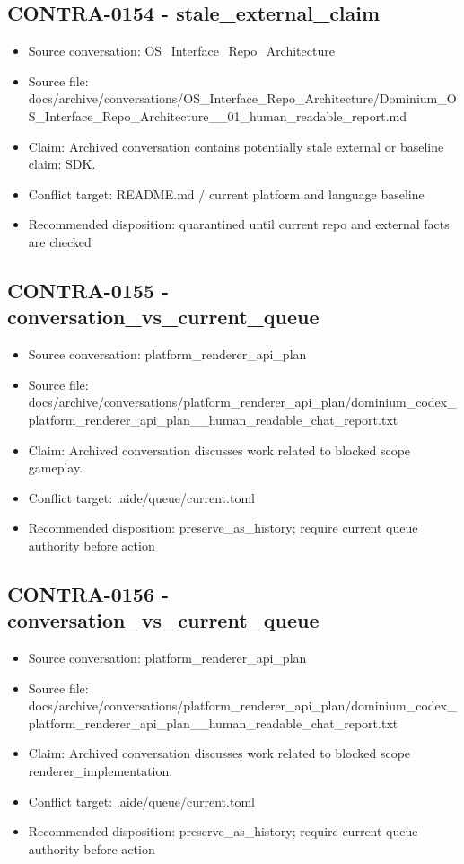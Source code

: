 \documentclass[11pt,a4paper]{report}
\begin{document}
\subsection{CONTRA-0154 - stale\_external\_claim}

\begin{itemize}
\item Source conversation: OS\_Interface\_Repo\_Architecture
\item Source file: docs/archive/conversations/OS\_Interface\_Repo\_Architecture/Dominium\_OS\_Interface\_Repo\_Architecture\_\_01\_human\_readable\_report.md
\item Claim: Archived conversation contains potentially stale external or baseline claim: SDK.
\item Conflict target: README.md / current platform and language baseline
\item Recommended disposition: quarantined until current repo and external facts are checked
\end{itemize}

\subsection{CONTRA-0155 - conversation\_vs\_current\_queue}

\begin{itemize}
\item Source conversation: platform\_renderer\_api\_plan
\item Source file: docs/archive/conversations/platform\_renderer\_api\_plan/dominium\_codex\_platform\_renderer\_api\_plan\_\_human\_readable\_chat\_report.txt
\item Claim: Archived conversation discusses work related to blocked scope gameplay.
\item Conflict target: .aide/queue/current.toml
\item Recommended disposition: preserve\_as\_history; require current queue authority before action
\end{itemize}

\subsection{CONTRA-0156 - conversation\_vs\_current\_queue}

\begin{itemize}
\item Source conversation: platform\_renderer\_api\_plan
\item Source file: docs/archive/conversations/platform\_renderer\_api\_plan/dominium\_codex\_platform\_renderer\_api\_plan\_\_human\_readable\_chat\_report.txt
\item Claim: Archived conversation discusses work related to blocked scope renderer\_implementation.
\item Conflict target: .aide/queue/current.toml
\item Recommended disposition: preserve\_as\_history; require current queue authority before action
\end{itemize}
\end{document}
